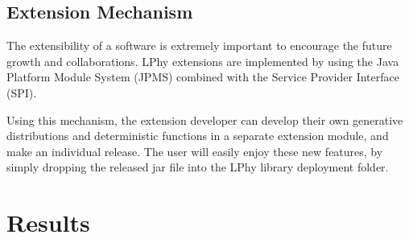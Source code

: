 \documentclass[10pt,letterpaper,table]{article}
\begin{document}
{%







\subsection*{Extension Mechanism}
The extensibility of a software is extremely important to encourage the future growth and collaborations. 
LPhy extensions are implemented by using the Java Platform Module System (JPMS) combined with the Service Provider Interface (SPI).

Using this mechanism, the extension developer can develop their own generative distributions and deterministic functions in a separate extension module, and make an individual release.
The user will easily enjoy these new features, by simply dropping the released jar file into the LPhy library deployment folder.



\section*{Results}

}
\end{document}
